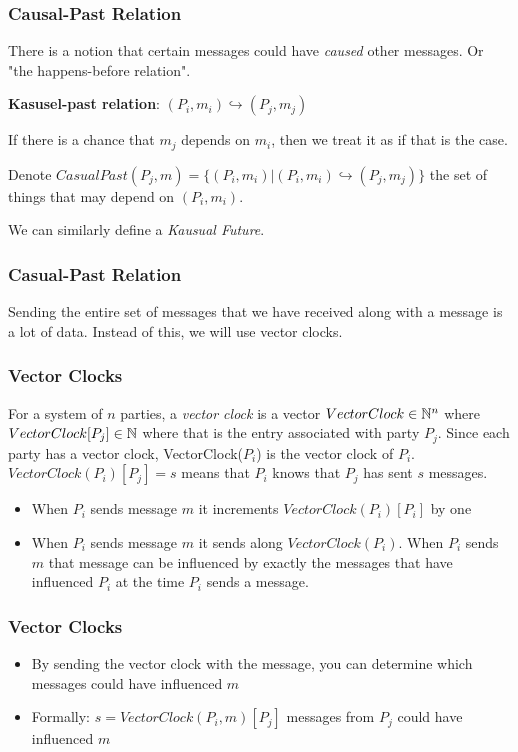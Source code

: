     \begin{frame}
        \frametitle{Causal-Past Relation}
            There is a notion that certain messages could have \textit{caused} other messages. Or "the happens-before relation". 

            \textbf{Kasusel-past relation}: $(P_i, m_i) \hookrightarrow (P_j, m_j)$
        
            If there is a chance that $m_j$ depends on $m_i$, then we treat it as if that is the case. 

            Denote $CasualPast(P_j, m) = \{(P_i, m_i) | (P_i, m_i) \hookrightarrow (P_j, m_j) \}$ the set of things that may depend on $(P_i, m_i)$. 

            We can similarly define a \textit{Kausual Future}. 
    \end{frame}

    \begin{frame}
        \frametitle{Casual-Past Relation}
            Sending the entire set of messages that we have received along with a message is a lot of data. Instead of this, we will use vector clocks.
    \end{frame}

    \begin{frame}
        \frametitle{Vector Clocks}
            For a system of $n$ parties, a \textit{vector clock} is a vector $VectorClock \in \mathbb{N}^n$ where $VectorClock[P_j] \in \mathbb{N}$ where that is the entry associated with party $P_j$. Since each party has a vector clock, VectorClock($P_i$) is the vector clock of $P_i$.
            $VectorClock(P_i)[P_j] = s$ means that $P_i$ knows that $P_j$ has sent $s$ messages. 
            \begin{itemize}
                \item When $P_i$ sends message $m$ it increments $VectorClock(P_i)[P_i]$ by one
                \item When $P_i$ sends message $m$ it sends along $VectorClock(P_i)$. When $P_i$ sends $m$ that message can be influenced by exactly the messages that have influenced $P_i$ at the time $P_i$ sends a message. 
            \end{itemize}
    \end{frame}
    \begin{frame}
        \frametitle{Vector Clocks}
            \begin{itemize}
                \item By sending the vector clock with the message, you can determine which messages could have influenced $m$
                \item Formally: $s = VectorClock(P_i, m)[P_j]$ messages from $P_j$ could have influenced $m$
            \end{itemize}
    \end{frame}

